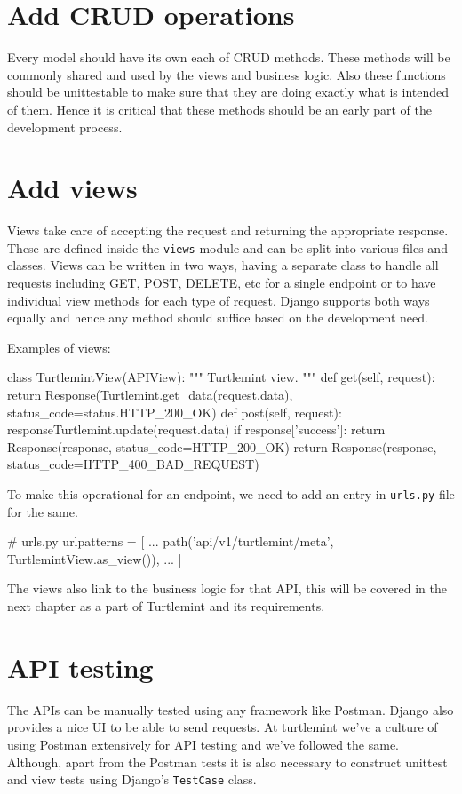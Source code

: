 \section{Add CRUD operations}
Every model should have its own each of CRUD methods. These methods will be
commonly shared and used by the views and business logic. Also these functions
should be unittestable to make sure that they are doing exactly what is
intended of them. Hence it is critical that these methods should be an early
part of the development process.

\section{Add views}
Views take care of accepting the request and returning the appropriate
response. These are defined inside the \texttt{views} module and can be split
into various files and classes. Views can be written in two ways, having a
separate class to handle all requests including GET, POST, DELETE, etc for a
single endpoint or to have individual view methods for each type of request.
Django supports both ways equally and hence any method should suffice based
on the development need.

Examples of views:
\begin{pythoncode}
class TurtlemintView(APIView):
    """
    Turtlemint view.
    """
    def get(self, request):
        return Response(Turtlemint.get_data(request.data),
                        status_code=status.HTTP_200_OK)
    def post(self, request):
        responseTurtlemint.update(request.data)
        if response['success']:
            return Response(response, status_code=HTTP_200_OK)
        return Response(response, status_code=HTTP_400_BAD_REQUEST)
\end{pythoncode}

To make this operational for an endpoint, we need to add an entry in
\texttt{urls.py} file for the same.

\begin{pythoncode}
# urls.py
urlpatterns = [
    ...
    path('api/v1/turtlemint/meta', TurtlemintView.as_view()),
    ...
]
\end{pythoncode}

The views also link to the business logic for that API, this will be covered
in the next chapter as a part of Turtlemint and its requirements.

\section{API testing}
The APIs can be manually tested using any framework like Postman. Django also
provides a nice UI to be able to send requests. At turtlemint we've a culture
of using Postman extensively for API testing and we've followed the same.
Although, apart from the Postman tests it is also necessary to construct
unittest and view tests using Django's \texttt{TestCase} class.

